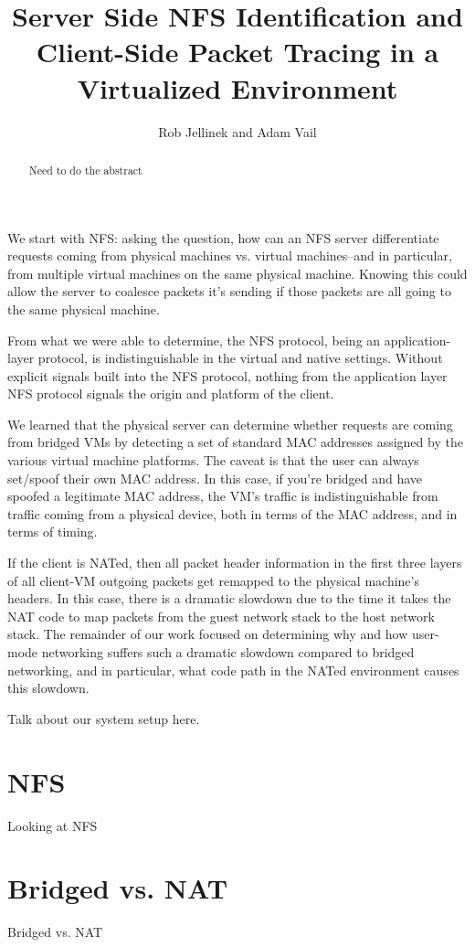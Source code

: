 \documentclass[11pt,pdftex,twocolumn]{article}
\title{Server Side NFS Identification and Client-Side Packet Tracing in a Virtualized Environment}
\author{Rob Jellinek and Adam Vail}
\begin{document}
\maketitle

\begin{abstract}
Need to do the abstract
\end{abstract}

We start with NFS: asking the question, how can an NFS server differentiate requests coming from physical machines vs. virtual machines--and in particular, from multiple virtual machines on the same physical machine. Knowing this could allow the server to coalesce packets it's sending if those packets are all going to the same physical machine. 

From what we were able to determine, the NFS protocol, being an application-layer protocol, is indistinguishable in the virtual and native settings. Without explicit signals built into the NFS protocol, nothing from the application layer NFS protocol signals the origin and platform of the client. 

We learned that the physical server can determine whether requests are coming from bridged VMs by detecting a set of standard MAC addresses assigned by the various virtual machine platforms. The caveat is that the user can always set/spoof their own MAC address. In this case, if you're bridged and have spoofed a legitimate MAC address, the VM's traffic is indistinguishable from traffic coming from a physical device, both in terms of the MAC address, and in terms of timing.

If the client is NATed, then all packet header information in the first three layers of all client-VM outgoing packets get remapped to the physical machine's headers. In this case, there is a dramatic slowdown due to the time it takes the NAT code to map packets from the guest network stack to the host network stack. The remainder of our work focused on determining why and how user-mode networking suffers such a dramatic slowdown compared to bridged networking, and in particular, what code path in the NATed environment causes this slowdown.


%


Talk about our system setup here. 

\section{NFS}
Looking at NFS

\section{Bridged vs. NAT}
Bridged vs. NAT
\end{document}
